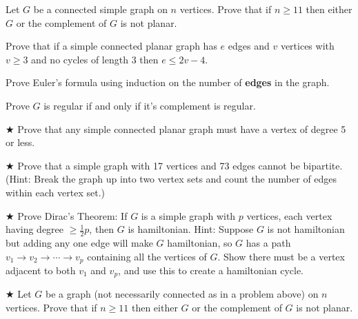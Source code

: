 \begin{proofp}
Let $G$ be a connected simple graph on $n$ vertices.  Prove that if $n \ge 11$ then either $G$ or the complement of $G$ is not planar.
\end{proofp}

\begin{proofp}
Prove that if a simple connected planar graph has $e$ edges and $v$ vertices with $v \ge 3$ and no cycles of length 3 then $e \le 2v-4$.
\end{proofp}

\begin{proofp}
Prove Euler's formula using induction on the number of  {\bf edges} in the graph.
\end{proofp}

\begin{proofp}
Prove $G$ is regular if and only if it's complement is regular.
\end{proofp}

\begin{proofp}$\bigstar$
Prove that any simple connected planar graph must have a vertex of degree 5 or less.
\end{proofp}

\begin{proofp}$\bigstar$
Prove that a simple graph with 17 vertices and 73 edges cannot be bipartite. (Hint: Break the graph up into two vertex sets and count the number of edges within each vertex set.)
\end{proofp}

\begin{proofp} $\bigstar$
Prove Dirac's Theorem: If $G$ is a simple graph with $p$ vertices, each vertex having degree $\ge \frac{1}{2}p$, then $G$ is hamiltonian. Hint: Suppose $G$ is not hamiltonian but adding any one edge will make $G$ hamiltonian, so $G$ has a path $v_1 \rightarrow v_2 \rightarrow \cdots \rightarrow v_p$ containing all the vertices of $G$.  Show there must be a vertex adjacent to both $v_1$ and $v_p$, and use this to create a hamiltonian cycle. 
\end{proofp}

\begin{proofp}$\bigstar$
Let $G$ be a graph (not necessarily connected as in a problem above) on $n$ vertices.  Prove that if $n \ge 11$ then either $G$ or the complement of $G$ is not planar.
\end{proofp}



